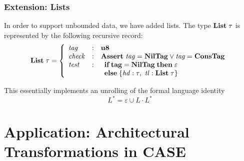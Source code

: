 \documentclass{beamer}
\newcommand{\konst}[1]{\ensuremath{\mbox{\bf{#1}}}}
\newcommand{\kstar}[1]{\ensuremath{{#1}^{*}}}
\begin{document}
\begin{frame}\frametitle{Extension: Lists}

In order to support unbounded data, we have added lists. The type
$\konst{List}\;\tau$ is represented by the following recursive record:
%
\[
 \konst{List}\;\tau =
   \left\{
     \begin{array}{lcl}
       \mathit{tag} & : & \konst{u8} \\
        \mathit{check} & : &
         \konst{Assert}\ \mathit{tag} = \konst{NilTag} \lor \mathit{tag} = \konst{ConsTag} \\
       \mathit{test} & : &
       \begin{array}[t] {l}
         \konst{if}\; \konst{tag} = \konst{NilTag}\; \konst{then}\; \varepsilon \\
          \konst{else}\; \{ \mathit{hd} : \tau, \ \mathit{tl} : \konst{List}\; \tau \}
       \end{array}
     \end{array}
   \right.
\]

This essentially implements an unrolling of the formal language identity
%
\[ \kstar{L} = \varepsilon \cup L \cdot \kstar{L} \]


\end{frame}


\section {Application: Architectural Transformations in CASE}
\end{document}
